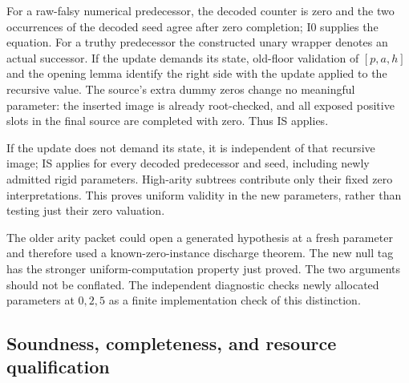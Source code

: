 \documentclass[11pt,letterpaper]{article}
\theoremstyle{definition}\newtheorem{definition}[theorem]{Definition}
\theoremstyle{remark}\newtheorem{remark}[theorem]{Remark}
\begin{document}
For a raw-falsy numerical predecessor, the decoded counter is zero and
the two occurrences of the decoded seed agree after zero completion;
I0 supplies the equation. For a truthy predecessor the constructed unary
wrapper denotes an actual successor. If the update demands its state,
old-floor validation of $[p,a,h]$ and the opening lemma identify the
right side with the update applied to the recursive value. The source's
extra dummy zeros change no meaningful parameter: the inserted image
is already root-checked, and all exposed positive slots in the final
source are completed with zero. Thus IS applies.

If the update does not demand its state, it is independent of that
recursive image; IS applies for every decoded predecessor and seed,
including newly admitted rigid parameters. High-arity subtrees contribute
only their fixed zero interpretations. This proves uniform validity in
the new parameters, rather than testing just their zero valuation.

The older arity packet could open a generated hypothesis at a fresh
parameter and therefore used a known-zero-instance discharge theorem.
The new null tag has the stronger uniform-computation property just
proved. The two arguments should not be conflated. The independent
diagnostic checks newly allocated parameters at $0,2,5$ as a finite
implementation check of this distinction.

\subsection{Soundness, completeness, and resource qualification}
\end{document}
